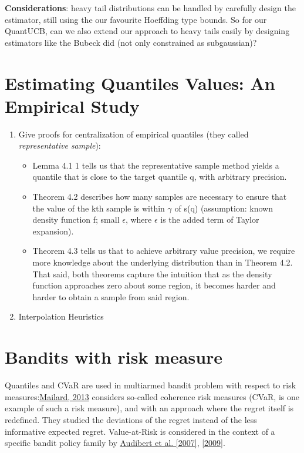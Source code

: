 \documentclass{article}
\begin{document}
\textbf{Considerations}: heavy tail distributions can be handled by carefully design the estimator, still using the our favourite  Hoeffding type bounds. So for our QuantUCB, can we also extend our approach to heavy tails easily by designing estimators like the Bubeck did (not only constrained as subgaussian)? 

\section{Estimating Quantiles Values: An Empirical Study}

\begin{enumerate}
    \item Give proofs for centralization of empirical quantiles (they called \textit{representative sample}):
        \begin{itemize}
            \item Lemma 4.1 1 tells us that the representative sample method yields a quantile that is close to the target quantile q, with arbitrary precision.
            \item Theorem 4.2 describes how many samples are necessary to ensure that the value of the kth sample is within $\gamma$ of s(q) (assumption: known density function f; small $\epsilon$, where $\epsilon$ is the added term of Taylor expansion).
            \item Theorem 4.3 tells us that to achieve arbitrary value precision, we require more knowledge about the underlying distribution than in Theorem 4.2. That said, both theorems capture the intuition that as the density function approaches zero about some region, it becomes harder and harder to obtain a sample from said region.
        \end{itemize}
    \item Interpolation Heuristics
\end{enumerate}

\section{Bandits with risk measure}
Quantiles and CVaR are used in multiarmed bandit problem with respect to risk measures:\href{http://link.springer.com/10.1007/978-3-642-40935-6_16}{Mailard, 2013} considers so-called coherence risk measures (CVaR, is one example of such a risk measure), and with an approach where the regret itself is redefined. They studied the deviations of the regret instead of the less informative expected regret.
Value-at-Risk is considered in the context of a specific bandit policy family by \href{http://link.springer.com/10.1007/978-3-540-75225-7_15}{Audibert et al. [2007]}, \href{https://linkinghub.elsevier.com/retrieve/pii/S030439750900067X}{[2009]}.
\end{document}
